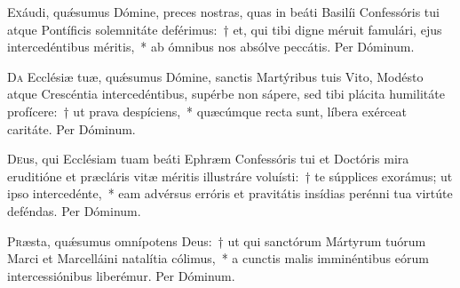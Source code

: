 \documentclass[vesperale_romanum.tex]{subfiles}
\begin{document}
\oratio

\lettrine{E}{x}áudi, quǽsumus Dómine, preces nostras, quas in beáti Basilíi Confessóris tui atque Pontíficis sole\-mnitáte deférimus:~† et, qui tibi digne méruit famulári, ejus intercedéntibus méritis,~* ab ómnibus nos absólve peccátis. Per Dóminum.

\hicvir

\commsequentis
\myrule



\oratio

\lettrine{D}{a} Ecclésiæ tuæ, quǽsumus Dómine, san\-ctis Martýribus tuis Vito, Modésto atque Crescéntia intercedéntibus, supérbe non sápere, sed tibi plácita humilitáte profícere:~† ut prava despíciens,~* quæcúmque re\-cta sunt, líbera exérceat caritáte. Per Dóminum.

\myrule



\duplex

\odoctoroptime

\oratio

\lettrine{D}{e}us, qui Ecclésiam tuam beáti Ephræm Confessóris tui et Doctóris mira eruditióne et præcláris vitæ méritis illustráre voluísti:~† te súpplices exorámus; ut i\-pso intercedénte,~* eam advérsus erróris et pravitátis insídias perénni tua virtúte deféndas.
Per Dóminum.


\oratio

\lettrine{P}{r}æsta, quǽsumus omnípotens Deus:~† ut qui san\-ctórum Mártyrum tuórum Marci et Marcelláini natalítia cólimus,~* a cun\-ctis malis imminéntibus eórum intercessiónibus liberémur. Per Dóminum.
\end{document}
